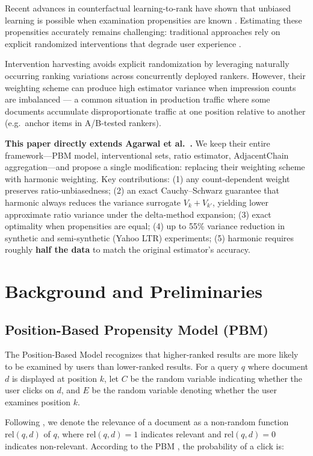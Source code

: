 \documentclass[sigconf]{acmart}
\begin{document}
Recent advances in counterfactual learning-to-rank have shown that unbiased learning is possible when examination propensities are known \cite{joachims2017unbiased}. Estimating these propensities accurately remains challenging: traditional approaches rely on explicit randomized interventions that degrade user experience \cite{wang2018position}.

Intervention harvesting \cite{agarwal2019estimating} avoids explicit randomization by leveraging naturally occurring ranking variations across concurrently deployed rankers. However, their weighting scheme can produce high estimator variance when impression counts are imbalanced --- a common situation in production traffic where some documents accumulate disproportionate traffic at one position relative to another (e.g.\ anchor items in A/B-tested rankers).

\textbf{This paper directly extends Agarwal et al.~\cite{agarwal2019estimating}.} We keep their entire framework—PBM model, interventional sets, ratio estimator, AdjacentChain aggregation—and propose a single modification: replacing their weighting scheme with harmonic weighting. Key contributions: (1) any count-dependent weight preserves ratio-unbiasedness; (2) an exact Cauchy–Schwarz guarantee that harmonic always reduces the variance surrogate $V_k + V_{k'}$, yielding lower approximate ratio variance under the delta-method expansion; (3) exact optimality when propensities are equal; (4) up to 55\% variance reduction in synthetic and semi-synthetic (Yahoo LTR) experiments; (5) harmonic requires roughly \textbf{half the data} to match the original estimator's accuracy.

\section{Background and Preliminaries}
\label{sec:background}

\subsection{Position-Based Propensity Model (PBM)}
The Position-Based Model recognizes that higher-ranked results are more likely to be examined by users than lower-ranked results. For a query $q$ where document $d$ is displayed at position $k$, let $C$ be the random variable indicating whether the user clicks on $d$, and $E$ be the random variable denoting whether the user examines position $k$.

Following \cite{agarwal2019estimating}, we denote the relevance of a document as a non-random function $\textrm{rel}(q,d)$ of $q$, where $\textrm{rel}(q,d) = 1$ indicates relevant and $\textrm{rel}(q,d) = 0$ indicates non-relevant. According to the PBM \cite{richardson2007predicting, chuklin2015click}, the probability of a click is:
\end{document}
